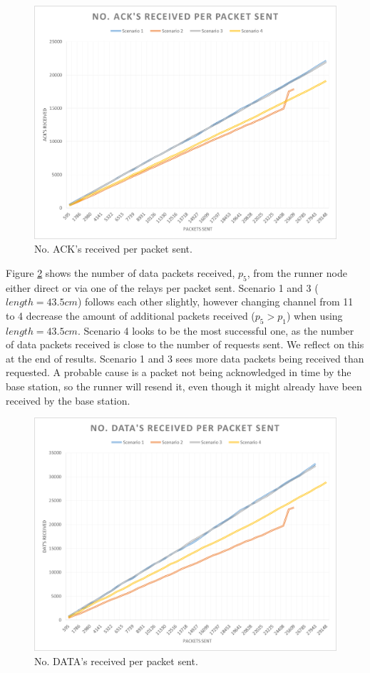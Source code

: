\begin{figure}[h]
	\centering
	\includegraphics[width=1\linewidth]{results/NoAckReceived}
	\caption{No. ACK's received per packet sent.}
	\label{fig:noackreceived}
\end{figure}

\noindent Figure \ref{fig:nodatareceived} shows the number of data packets received, $p_5$, from the runner node either direct or via one of the relays per packet sent. Scenario 1 and 3 ($length = 43.5cm$) follows each other slightly, however changing channel from 11 to 4 decrease the amount of additional packets received ($p_5 > p_1$) when using $length = 43.5cm$. Scenario 4 looks to be the most successful one, as the number of data packets received is close to the number of requests sent. We reflect on this at the end of results. Scenario 1 and 3 sees more data packets being received than requested. A probable cause is a packet not being acknowledged in time by the base station, so the runner will resend it, even though it might already have been received by the base station.

\begin{figure}[h]
	\centering
	\includegraphics[width=1\linewidth]{results/NoDataReceived}
	\caption{No. DATA's received per packet sent.}
	\label{fig:nodatareceived}
\end{figure}


